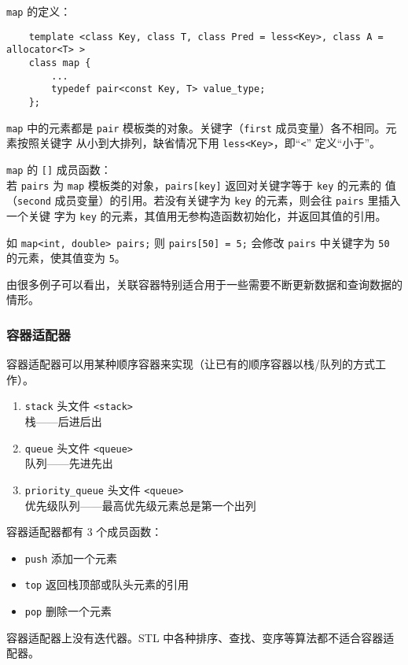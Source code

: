 \documentclass[UTF8]{ctexart}
\begin{document}
\texttt{map} 的定义：
\begin{verbatim}
    template <class Key, class T, class Pred = less<Key>, class A = allocator<T> >
    class map {
        ...
        typedef pair<const Key, T> value_type;
    };
\end{verbatim}
\texttt{map} 中的元素都是 \texttt{pair} 模板类的对象。关键字（\texttt{first} 成员变量）各不相同。元素按照关键字
从小到大排列，缺省情况下用 \texttt{less<Key>}，即“\texttt{<}” 定义“小于”。

\texttt{map} 的 \texttt{[]} 成员函数：\\
若 \texttt{pairs} 为 \texttt{map} 模板类的对象，\texttt{pairs[key]} 返回对关键字等于 \texttt{key} 的元素的
值（\texttt{second} 成员变量）的引用。若没有关键字为 \texttt{key} 的元素，则会往 \texttt{pairs} 里插入一个关键
字为 \texttt{key} 的元素，其值用无参构造函数初始化，并返回其值的引用。

如 \texttt{map<int, double> pairs;} 则 \texttt{pairs[50] = 5;} 会修改 \texttt{pairs}
中关键字为 \texttt{50} 的元素，使其值变为 \texttt{5}。

由很多例子可以看出，关联容器特别适合用于一些需要不断更新数据和查询数据的情形。

\subsubsection{容器适配器}
容器适配器可以用某种顺序容器来实现（让已有的顺序容器以栈/队列的方式工作）。
\begin{enumerate}
    \item \texttt{stack} 头文件 \texttt{<stack>} \\
    栈——后进后出
    \item \texttt{queue} 头文件 \texttt{<queue>} \\
    队列——先进先出
    \item \texttt{priority\_queue} 头文件 \texttt{<queue>} \\
    优先级队列——最高优先级元素总是第一个出列
\end{enumerate}

容器适配器都有 3 个成员函数：
\begin{itemize}
    \item \texttt{push} 添加一个元素
    \item \texttt{top} 返回栈顶部或队头元素的引用
    \item \texttt{pop} 删除一个元素
\end{itemize}

容器适配器上没有迭代器。STL 中各种排序、查找、变序等算法都不适合容器适配器。
\end{document}
